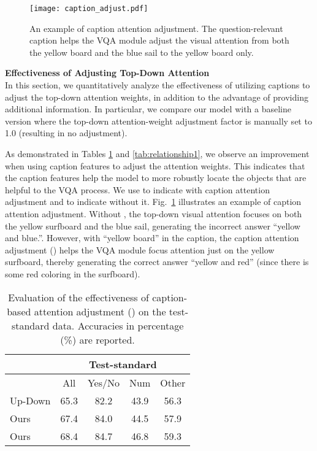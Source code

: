 \documentclass[11pt,a4paper]{article}
\begin{document}
\begin{figure}[!h]
\centering
\texttt{[image: caption\_adjust.pdf]}
\caption{An example of caption attention adjustment. The question-relevant caption helps the VQA module adjust the visual attention from both the yellow board and the blue sail to the yellow board only. }
\label{fig:caption_adjust}
\end{figure}


\noindent\textbf{Effectiveness of Adjusting Top-Down Attention}\\
In this section, we quantitatively analyze the effectiveness of utilizing captions to adjust the top-down attention weights, in addition to the advantage of providing additional information.
In particular, we compare our model with a baseline version where the top-down attention-weight adjustment factor  is manually set to 1.0 (resulting in no adjustment). 

As demonstrated in Tables \ref{tab:relationship} and \ref{tab:relationship1}, we observe an improvement when using caption features to adjust the attention weights. This indicates that the caption features help the model to more robustly locate the objects that are helpful to the VQA process. We use  to indicate with caption attention adjustment and  to indicate without it. Fig.\ \ref{fig:caption_adjust} illustrates an example of caption attention adjustment. Without , the top-down visual attention focuses on both the yellow surfboard and the blue sail, generating the incorrect answer ``yellow and blue.''. However, with ``yellow board'' in the caption, the caption attention adjustment () helps the VQA module focus attention just on the yellow surfboard, thereby generating the correct answer ``yellow and red'' (since there is some red coloring in the surfboard).
 \begin{table}[h]
\centering
\begin{tabular}{l|cccc}
\hline \toprule
                  & \multicolumn{4}{c}{Test-standard} \\\hline
                  & {\footnotesize All }   & {\footnotesize Yes/No}  & {\footnotesize Num}   & {\footnotesize Other}  \\ \hline\hline
Up-Down              & 65.3   & 82.2    & 43.9  & 56.3  \\
Ours  & 67.4   & 84.0 & 44.5 & 57.9\\
Ours  & 68.4  &  84.7 & 46.8 &  59.3     \\\bottomrule
\end{tabular}
\caption{Evaluation of the effectiveness of caption-based attention adjustment () on the test-standard data. Accuracies in percentage (\%) are reported.}
\label{tab:relationship}
\end{table}
\end{document}
